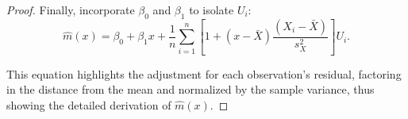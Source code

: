\documentclass[12pt]{amsart}
\theoremstyle{definition}
\numberwithin{equation}{section}
\begin{document}
\begin{proof}
    Finally, incorporate \(\beta_0\) and \(\beta_1\) to isolate \(U_i\):
    \[ \widehat{m}(x) = \beta_0 + \beta_1x + \frac{1}{n}\sum_{i=1}^n\left[1 + (x - \bar{X})\frac{(X_i - \bar{X})}{s_X^2}\right]U_i. \]

    This equation highlights the adjustment for each observation's residual, factoring in the distance from the mean and normalized by the sample variance, thus showing the detailed derivation of \( \widehat{m}(x) \).
\end{proof}
\end{document}
